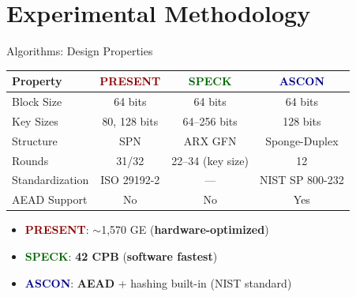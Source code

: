 \documentclass[aspectratio=169]{beamer}
\begin{document}
\section{Experimental Methodology}

\begin{frame}{Algorithms: Design Properties}
\vspace{-0.4cm}
\begin{table}
    \centering
    \begin{tabular}{lccc}
        \toprule
        \textbf{Property} & \textcolor{darkred}{\textbf{PRESENT}} & \textcolor{darkgreen}{\textbf{SPECK}} & \textcolor{darkblue}{\textbf{ASCON}} \\
        \midrule
        Block Size & 64 bits & 64 bits & 64 bits \\
        Key Sizes & 80, 128 bits & 64–256 bits & 128 bits \\
        Structure & SPN & ARX GFN & Sponge-Duplex \\
        Rounds & 31/32 & 22–34 (key size) & 12 \\
        Standardization & ISO 29192-2 & --- & NIST SP 800-232 \\
        AEAD Support & No & No & Yes \\
        \bottomrule
    \end{tabular}
\end{table}

\vspace{0.15cm}
\textbf{}
\begin{itemize}
    \item \textbf{\textcolor{darkred}{PRESENT}}: $\sim$1,570 GE (\textbf{hardware-optimized})
    \item \textbf{\textcolor{darkgreen}{SPECK}}: \textbf{42 CPB} (\textbf{software fastest})
    \item \textbf{\textcolor{darkblue}{ASCON}}: \textbf{AEAD} + hashing built-in (\alert{NIST standard})
\end{itemize}
\end{frame}
\end{document}
